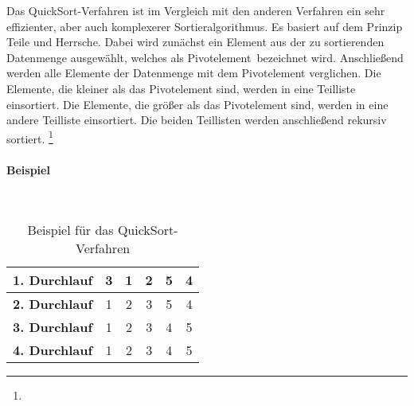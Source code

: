 \documentclass[../entry.tex]{subfiles}
\begin{document}
    Das \dq QuickSort\dq-Verfahren ist im Vergleich mit den anderen Verfahren ein sehr effizienter,
    aber auch komplexerer Sortieralgorithmus.
    Es basiert auf dem Prinzip \dq Teile und Herrsche\dq.
    Dabei wird zunächst ein Element aus der zu sortierenden Datenmenge ausgewählt,
    welches als \dq Pivotelement\dq\ bezeichnet wird.
    Anschließend werden alle Elemente der Datenmenge mit dem Pivotelement verglichen.
    Die Elemente, die kleiner als das Pivotelement sind, werden in eine Teilliste einsortiert.
    Die Elemente, die größer als das Pivotelement sind, werden in eine andere Teilliste einsortiert.
    Die beiden Teillisten werden anschließend rekursiv sortiert.
    \footnote{}

    \paragraph{Beispiel} \mbox{}\\

    \begin{table}[h]
        \centering
        \begin{tabular}{|c|c|c|c|c|c|}
            \hline
            \textbf{1. Durchlauf} & 3 & 1 & {\color{red}2} & 5 & 4 \\
            \hline
            \textbf{2. Durchlauf} & 1 & {\color{red}2} & 3 & 5 & 4 \\
            \hline
            \textbf{3. Durchlauf} & 1 & 2 & 3 & {\color{red}4} & 5 \\
            \hline
            \textbf{4. Durchlauf} & 1 & 2 & 3 & 4 & 5 \\
            \hline
        \end{tabular}
        \caption{Beispiel für das \dq QuickSort\dq-Verfahren}
        \label{tab:quicksort}
    \end{table}
\end{document}
